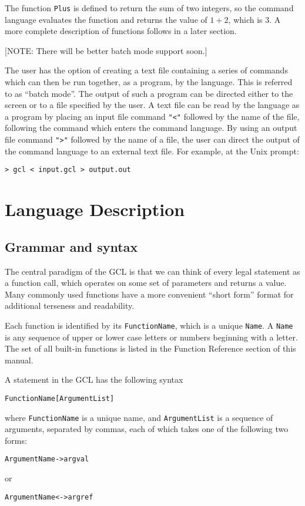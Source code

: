 The function \verb+Plus+ is defined to return the sum of two integers,
so the command language evaluates the function and returns the value of
$1 + 2$, which is 3.  A more complete description of functions follows in
a later section.

[NOTE: There will be better batch mode support soon.]

The user has the option of creating a text file containing a series of
commands which can then be run together, as a program, by the
language.  This is referred to as ``batch mode''.
The output of such a program can be directed either to the
screen or to a file specified by the user.  A text file can be read by
the language as a program by placing an input file command {\tt "<"}
followed by the name of the file, following the command which enters
the command language.  By using an output file command {\tt ">"}
followed by the name of a file, the user can direct the output of the
command language to an external text file.  For example, at the Unix prompt:

\begin{verbatim}
> gcl < input.gcl > output.out
\end{verbatim}

\section{Language Description}

\subsection{Grammar and syntax}

The central paradigm of the GCL is that we can think of every legal
statement as a function call, which operates on some set of parameters and
returns a value.  Many commonly used functions have a more convenient
``short form'' format for additional terseness and readability.

Each function is identified by its \verb+FunctionName+, which is a
unique \verb+Name+.  A \verb+Name+ is any sequence of upper or lower
case letters or numbers beginning with a letter.  The set of all
built-in functions is listed in the Function Reference section of this
manual.

A statement in the GCL has the
following syntax
\begin{verbatim}
FunctionName[ArgumentList]
\end{verbatim}
where \verb+FunctionName+ is a unique name, and \verb+ArgumentList+ is
a sequence of arguments, separated by commas, each of which takes one
of the following two forms:
\begin{verbatim}
ArgumentName->argval
\end{verbatim}
or
\begin{verbatim}
ArgumentName<->argref
\end{verbatim}

